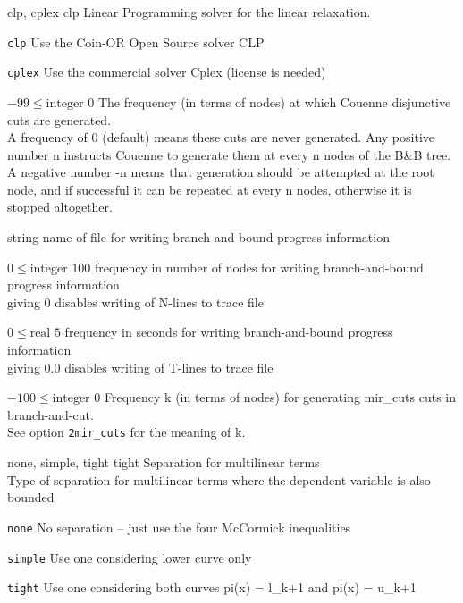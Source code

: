 %
{\ttfamily clp, cplex}%
{clp}%
{Linear Programming solver for the linear relaxation.}%
{\begin{list}{}{
\setlength{\parsep}{0em}
\setlength{\leftmargin}{5ex}
\setlength{\labelwidth}{2ex}
\setlength{\itemindent}{0ex}
\setlength{\topsep}{0pt}}
\item[\texttt{clp}] Use the Coin-OR Open Source solver CLP
\item[\texttt{cplex}] Use the commercial solver Cplex (license is needed)
\end{list}
}

%
{$-99\leq\textrm{integer}$}%
{$0$}%
{The frequency (in terms of nodes) at which Couenne disjunctive cuts are generated.\\
A frequency of 0 (default) means these cuts are never generated. Any positive number n instructs Couenne to generate them at every n nodes of the B\&B tree. A negative number -n means that generation should be attempted at the root node, and if successful it can be repeated at every n nodes, otherwise it is stopped altogether.}%
{}

%
{string}%
{}%
{name of file for writing branch-and-bound progress information}%
{}

%
{$0\leq\textrm{integer}$}%
{$100$}%
{frequency in number of nodes for writing branch-and-bound progress information\\
giving 0 disables writing of N-lines to trace file}%
{}

%
{$0\leq\textrm{real}$}%
{$5$}%
{frequency in seconds for writing branch-and-bound progress information\\
giving 0.0 disables writing of T-lines to trace file}%
{}

%
{$-100\leq\textrm{integer}$}%
{$0$}%
{Frequency k (in terms of nodes) for generating mir\_cuts cuts in branch-and-cut.\\
See option \texttt{2mir\_cuts} for the meaning of k.}%
{}

%
{\ttfamily none, simple, tight}%
{tight}%
{Separation for multilinear terms\\
Type of separation for multilinear terms where the dependent variable is also bounded}%
{\begin{list}{}{
\setlength{\parsep}{0em}
\setlength{\leftmargin}{5ex}
\setlength{\labelwidth}{2ex}
\setlength{\itemindent}{0ex}
\setlength{\topsep}{0pt}}
\item[\texttt{none}] No separation -- just use the four McCormick inequalities
\item[\texttt{simple}] Use one considering lower curve only
\item[\texttt{tight}] Use one considering both curves pi(x) = l\_{k+1} and pi(x) = u\_{k+1}
\end{list}
}

